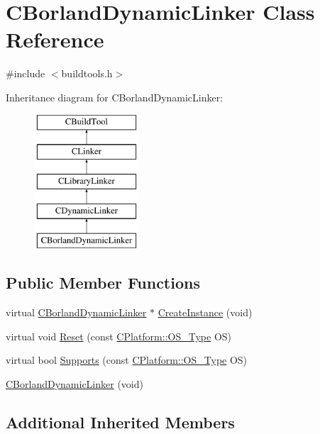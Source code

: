 \hypertarget{classCBorlandDynamicLinker}{\section{C\-Borland\-Dynamic\-Linker Class Reference}
\label{classCBorlandDynamicLinker}
}


{\ttfamily \#include $<$buildtools.\-h$>$}

Inheritance diagram for C\-Borland\-Dynamic\-Linker\-:\begin{figure}[H]
\begin{center}
\leavevmode
\includegraphics[height=5.000000cm]{da/d1c/classCBorlandDynamicLinker}
\end{center}
\end{figure}
\subsection*{Public Member Functions}
\begin{DoxyCompactItemize}
\item 
virtual \hyperlink{classCBorlandDynamicLinker}{C\-Borland\-Dynamic\-Linker} $\ast$ \hyperlink{classCBorlandDynamicLinker_ae76cbd521d03bd3eee2f1d5fe8836d03}{Create\-Instance} (void)
\item 
virtual void \hyperlink{classCBorlandDynamicLinker_acbf22349e7e89873dac5f55f8d9adc8b}{Reset} (const \hyperlink{classCPlatform_a2fb735c63c53052f79629e338bb0f535}{C\-Platform\-::\-O\-S\-\_\-\-Type} O\-S)
\item 
virtual bool \hyperlink{classCBorlandDynamicLinker_a78506817efc139b24fe28ebebde51942}{Supports} (const \hyperlink{classCPlatform_a2fb735c63c53052f79629e338bb0f535}{C\-Platform\-::\-O\-S\-\_\-\-Type} O\-S)
\item 
\hyperlink{classCBorlandDynamicLinker_ae16f9b25867092692e27de417640a9b1}{C\-Borland\-Dynamic\-Linker} (void)
\end{DoxyCompactItemize}
\subsection*{Additional Inherited Members}


